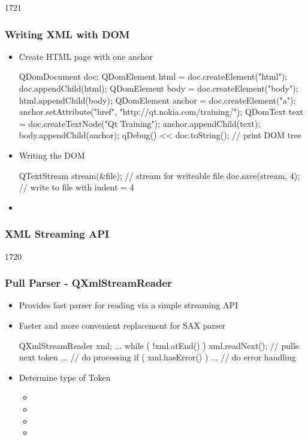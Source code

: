 \begin{slide}[fragile]{1721}\frametitle{Writing XML with DOM}
\begin{itemize}
\item Create HTML page with one anchor
  \begin{cpp}
QDomDocument doc;
QDomElement html = doc.createElement("html");
doc.appendChild(html);
QDomElement body = doc.createElement("body");
html.appendChild(body);
QDomElement anchor = doc.createElement("a");
anchor.setAttribute("href", "http://qt.nokia.com/training/");
QDomText text = doc.createTextNode("Qt Training");
anchor.appendChild(text);
body.appendChild(anchor);
qDebug() << doc.toString(); // print DOM tree
  \end{cpp}
\item Writing the DOM
  \begin{cpp}
QTextStream stream(&file); // stream for writeable file
doc.save(stream, 4); // write to file with indent = 4    
  \end{cpp}
 \item {}
  \end{itemize}
\end{slide}

\subsubsection{XML Streaming API}
\begin{slide}[fragile]{1720}\frametitle{Pull Parser - QXmlStreamReader} \label{QXmlStreamReader}
\begin{itemize}
\item Provides fast parser for reading via a simple streaming API
\item Faster and more convenient replacement for SAX parser
  \begin{cpp}
QXmlStreamReader xml;
...
while ( !xml.atEnd() ) {
  xml.readNext(); // pulls next token
  ... // do processing
}
if ( xml.hasError() ) {
  ... // do error handling
}    
  \end{cpp}
\item Determine type of Token
  \begin{itemize}
  \item {}
  \item {}
  \item {}
  \item {}
 \end{itemize}
\end{itemize}
\end{slide}

